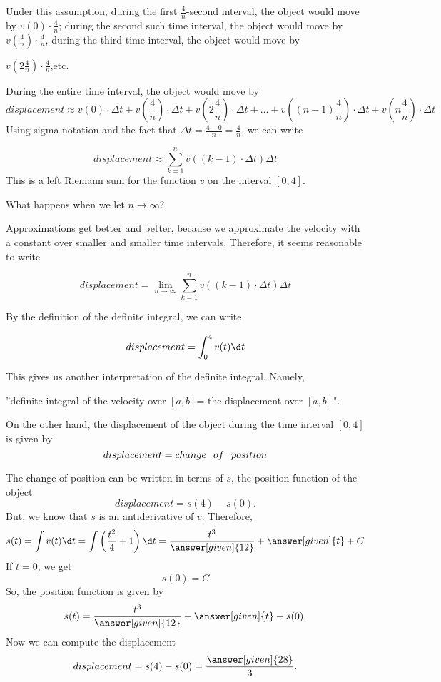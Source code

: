 \documentclass{ximera}
\begin{document}
\begin{example}
\begin{explanation}
 Under this assumption, during the first $\frac{4}{n}$-second interval, the object would move by $v(0)\cdot\frac{4}{n}$;  during the second such time interval, the object would move by $v\left(\frac{4}{n}\right)\cdot\frac{4}{n}$, during the third time interval, the object would move by 
 
 $v\left(2\frac{4}{n}\right)\cdot\frac{4}{n}$,etc. 
 
 During the entire time interval, the object would move by
\[
   displacement \approx v(0)\cdot\Delta t+v\left(\frac{4}{n}\right)\cdot\Delta t+v\left(2\frac{4}{n}\right)\cdot\Delta t+...+v\left((n-1)\frac{4}{n}\right)\cdot\Delta t+v\left(n\frac{4}{n}\right)\cdot\Delta t
\]
Using sigma notation and the fact that $\Delta t=\frac{4-0}{n}=\frac{4}{n}$, we can write

  \[
   displacement\approx \sum_{k=1}^nv((k-1)\cdot\Delta t)\Delta t
\]
  This is a left Riemann sum for the function $v$ on the interval $[0,4]$.
  
  
What happens when we let $n\to\infty$?

Approximations get better and better, because we approximate the velocity with a constant over smaller and smaller time intervals.
Therefore, it seems reasonable to  write

  \[
   displacement=\lim_{n\to\infty}\sum_{k=1}^nv((k-1)\cdot\Delta t)\Delta t
\]

By  the definition of the definite integral, we can write


  \[
   displacement=\int_{0}^{4}v(t)\d t
\]

This gives us another interpretation of the definite integral. Namely,



''definite integral of the velocity over $[a,b]$= the displacement over $[a,b]$".



  On the other hand, the displacement of the object during the time interval $[0,4]$ is given by
  \[
   displacement=change\hspace{0.1in} of\hspace{0.1in} position
\]
  
  The change of position can be written in terms of $s$, the position function of the object
  \[
   displacement=s(4)-s(0).
\]
But, we know that $s$ is an antiderivative of $v$. Therefore,
 \[
  s(t)=\int v(t)\d t=\int\left(\frac{t^2}{4}+1\right)\d t=\frac{t^3}{\answer[given]{12}}+\answer[given]{t}+C
\]
If $t=0$, we get
 \[
  s(0)=C
\]
So, the position function is given by
\[
  s(t)=\frac{t^3}{\answer[given]{12}}+\answer[given]{t}+s(0).
\]
Now we can compute the displacement
 \[
   displacement=s(4)-s(0)=\frac{\answer[given]{28}}{3}.
\]
  \end{explanation}
  

\end{example}
\end{document}
